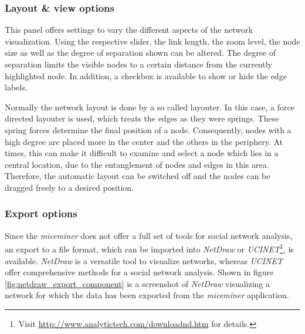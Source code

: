\subsubsection*{Layout \& view options}

This panel offers settings to vary the different aspects of the network visualization. Using the respective slider, the link length, the zoom level, the node size as well as the degree of separation shown can be altered. The degree of separation limits the visible nodes to a certain distance from the currently highlighted node. In addition, a checkbox is available to show or hide the edge labels.

Normally the network layout is done by a so called layouter. In this case, a force directed layouter is used, which treats the edges as they were springs. These spring forces determine the final position of a node. Consequently, nodes with a high degree are placed more in the center and the others in the periphery. At times, this can make it difficult to examine and select a node which lies in a central location, due to the entanglement of nodes and edges in this area. Therefore, the automatic layout can be switched off and the nodes can be dragged freely to a desired position.

\subsubsection*{Export options}

Since the \textit{miceminer} does not offer a full set of tools for social network analysis, an export to a file format, which can be imported into \textit{NetDraw} or \textit{UCINET}\footnote{Visit \href{http://www.analytictech.com/downloadnd.htm}{http://www.analytictech.com/downloadnd.htm} for details.}, is available. \textit{NetDraw} is a versatile tool to visualize networks, whereas \textit{UCINET} offer comprehensive methods for a social network analysis. Shown in figure \ref{fig:netdraw_export_component} is a screenshot of \textit{NetDraw} visualizing a network for which the data has been exported from the \textit{miceminer} application.

